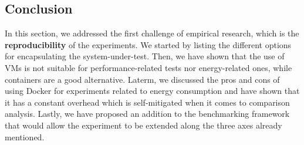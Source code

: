 








\subsection{Conclusion}

In this section, we addressed the first challenge of empirical research, which is the \textbf{reproducibility} of the experiments.
We started by listing the different options for encapsulating the system-under-test.
Then, we have shown that the use of VMs is not suitable for performance-related tests nor energy-related ones, while containers are a good alternative. Laterm, we discussed the pros and cons of using Docker for experiments related to energy consumption and have shown that it has a constant overhead which is self-mitigated when it comes to comparison analysis.
Lastly, we have proposed an addition to the benchmarking framework that would allow the experiment to be extended along the three axes already mentioned.



\clearpage